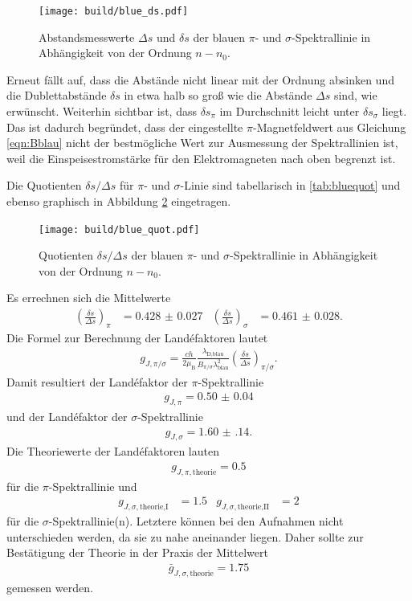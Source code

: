 \begin{figure}[H]
  \centering
  \texttt{[image: build/blue\_ds.pdf]}
  \caption{Abstandsmesswerte $\Delta s$ und $\delta s$ der blauen $\pi$- und $\sigma$-Spektrallinie in Abhängigkeit von der Ordnung $n-n_0$.}
  \label{fig:blueds}
\end{figure}

Erneut fällt auf, dass die Abstände nicht linear mit der Ordnung absinken und die Dublettabstände $\delta s$ in etwa
halb so groß wie die Abstände $\Delta s$ sind, wie erwünscht. Weiterhin sichtbar ist, dass $\delta s_\pi$ im Durchschnitt
leicht unter $\delta s_\sigma$ liegt. Das ist dadurch begründet, dass der eingestellte $\pi$-Magnetfeldwert aus
Gleichung \eqref{eqn:Bblau} nicht der bestmögliche Wert zur Ausmessung der Spektrallinien ist, weil die Einspeisestromstärke
für den Elektromagneten nach oben begrenzt ist.

Die Quotienten $\delta s/\Delta s$ für $\pi$- und $\sigma$-Linie sind tabellarisch in \ref{tab:bluequot} und ebenso
graphisch in Abbildung \ref{fig:bluequot} eingetragen.

\begin{figure}[H]
  \centering
  \texttt{[image: build/blue\_quot.pdf]}
  \caption{Quotienten $\delta s/\Delta s$ der blauen $\pi$- und $\sigma$-Spektrallinie in Abhängigkeit von der Ordnung $n-n_0$.}
  \label{fig:bluequot}
\end{figure}

Es errechnen sich die Mittelwerte
\begin{align}
  \left(\frac{\delta s}{\Delta s}\right)_\pi &= \num{0.428(27)} & \left(\frac{\delta s}{\Delta s}\right)_\sigma &= \num{0.461(28)}.
\end{align}
Die Formel zur Berechnung der Landéfaktoren lautet
\begin{align}
  g_{J,\pi/\sigma} = \frac{c h}{2 \mu_\text{B}} \frac{\lambda_\text{D,blau}}{B_{\pi/\sigma} \lambda_\text{blau}^2} \left(\frac{\delta s}{\Delta s}\right)_{\pi/\sigma}.
\end{align}
Damit resultiert der Landéfaktor der $\pi$-Spektrallinie
\begin{align}
  g_{J,\pi} = \num{0.50(4)}
\end{align}
und der Landéfaktor der $\sigma$-Spektrallinie
\begin{align}
  g_{J,\sigma} = \num{1.60(14)}.
\end{align}
Die Theoriewerte der Landéfaktoren lauten
\begin{align}
  g_{J,\pi,\text{theorie}} = 0.5
\end{align}
für die $\pi$-Spektrallinie und
\begin{align}
  g_{J,\sigma,\text{theorie,I}} &= 1.5 & g_{J,\sigma,\text{theorie,II}} &= 2
\end{align}
für die $\sigma$-Spektrallinie(n). Letztere können bei den Aufnahmen nicht unterschieden
werden, da sie zu nahe aneinander liegen. Daher sollte zur Bestätigung der Theorie in der
Praxis der Mittelwert
\begin{align}
  \bar{g}_{J,\sigma,\text{theorie}} = 1.75
\end{align}
gemessen werden.
